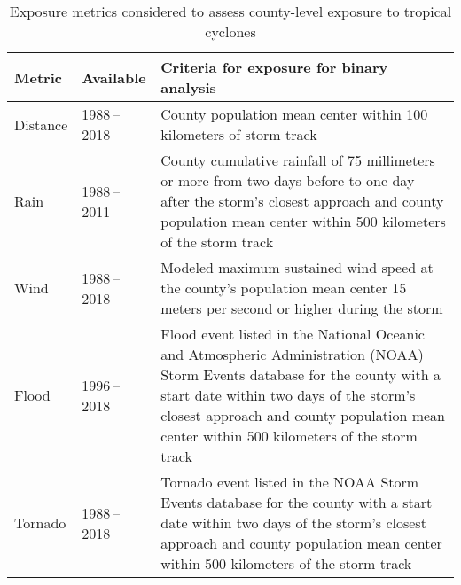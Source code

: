 \begin{table}%
\centering 
\caption{Exposure metrics considered to assess county-level exposure to 
tropical cyclones}
\begin{tabular}{p{0.9cm}p{2.5cm}p{9cm}} 
Metric & Available & Criteria for exposure for binary analysis \\ \midrule 
Distance & 1988\,--\,2018 & County population mean center within 100 kilometers of storm track \\ 
Rain & 1988\,--\,2011 & County cumulative rainfall of 75 millimeters or more from two days before to one day after the storm's closest approach and county population mean center within 500 kilometers of the storm track \\ 
Wind & 1988\,--\,2018 & Modeled maximum sustained wind speed at the county's population mean center 15 meters per second or higher during the storm\\ 
Flood & 1996\,--\,2018 & Flood event listed in the National Oceanic and Atmospheric Administration (NOAA) Storm Events database for the county with a start date within two days of the storm's closest approach and county population mean center within 500 kilometers of the storm track \\
Tornado & 1988\,--\,2018 & Tornado event listed in the NOAA Storm Events database for the county with a start date within two days of the storm's closest approach and county population mean center within 500 kilometers of the storm track\\
\bottomrule 
\end{tabular} 
\label{tab:exposuremetrics} 
\end{table}
